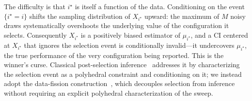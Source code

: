 \documentclass[conference]{IEEEtran}
\begin{document}
The difficulty is that $i^\star$ is itself a function of the data. Conditioning on the event $\{i^\star = i\}$ shifts the sampling distribution of $X_{i^\star}$ upward: the maximum of $M$ noisy draws systematically overshoots the underlying value of the configuration it selects. Consequently $X_{i^\star}$ is a positively biased estimator of $\mu_{i^\star}$, and a CI centered at $X_{i^\star}$ that ignores the selection event is conditionally invalid---it undercovers $\mu_{i^\star}$, the true performance of the very configuration being reported. This is the winner's curse. Classical post-selection inference~\cite{lee2016exact} addresses it by characterizing the selection event as a polyhedral constraint and conditioning on it; we instead adopt the data-fission construction~\cite{leiner2023datafission}, which decouples selection from inference without requiring an explicit polyhedral characterization of the sweep.
\end{document}
